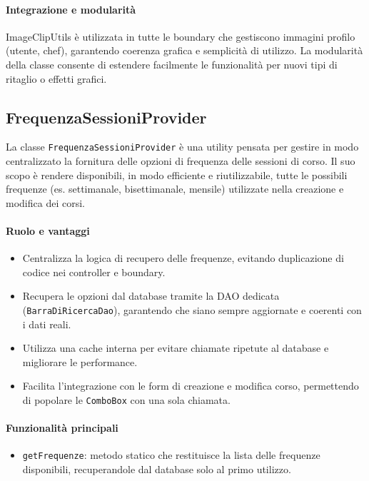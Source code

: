 \paragraph{Integrazione e modularità}
ImageClipUtils è utilizzata in tutte le boundary che gestiscono immagini profilo (utente, chef), garantendo coerenza grafica e semplicità di utilizzo. La modularità della classe consente di estendere facilmente le funzionalità per nuovi tipi di ritaglio o effetti grafici.

\subsection{FrequenzaSessioniProvider}
La classe \texttt{FrequenzaSessioniProvider} è una utility pensata per gestire in modo centralizzato la fornitura delle opzioni di frequenza delle sessioni di corso. Il suo scopo è rendere disponibili, in modo efficiente e riutilizzabile, tutte le possibili frequenze (es. settimanale, bisettimanale, mensile) utilizzate nella creazione e modifica dei corsi.

\paragraph{Ruolo e vantaggi}
\begin{itemize}
    \item Centralizza la logica di recupero delle frequenze, evitando duplicazione di codice nei controller e boundary.
    \item Recupera le opzioni dal database tramite la DAO dedicata (\texttt{BarraDiRicercaDao}), garantendo che siano sempre aggiornate e coerenti con i dati reali.
    \item Utilizza una cache interna per evitare chiamate ripetute al database e migliorare le performance.
    \item Facilita l'integrazione con le form di creazione e modifica corso, permettendo di popolare le \texttt{ComboBox} con una sola chiamata.
\end{itemize}

\paragraph{Funzionalità principali}
\begin{itemize}
    \item \texttt{getFrequenze}: metodo statico che restituisce la lista delle frequenze disponibili, recuperandole dal database solo al primo utilizzo.
\end{itemize}

